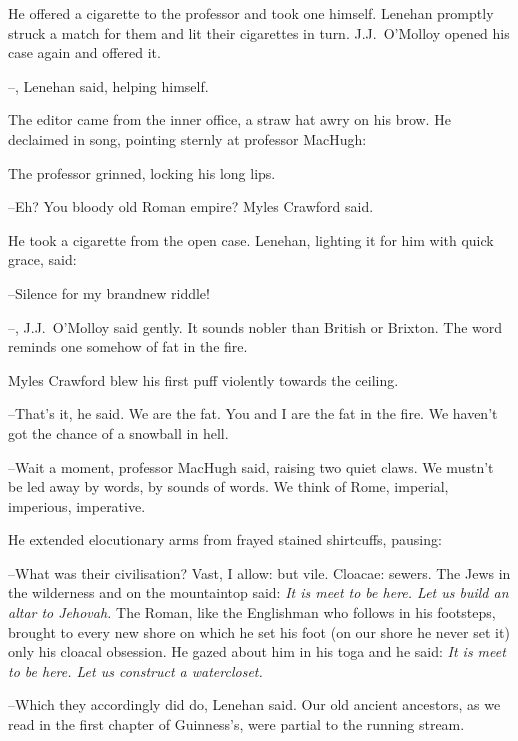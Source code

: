 
He offered a cigarette to the professor and took one himself.
Lenehan promptly struck a match for them and lit their cigarettes in turn.
J.J.~O'Molloy opened his case again and offered it.

--,
Lenehan said,
helping himself.

The editor came from the inner office,
a straw hat awry on his brow.
He declaimed in song,
pointing sternly at professor MacHugh:



The professor grinned,
locking his long lips.

--Eh?
You bloody old Roman empire?
Myles Crawford said.

He took a cigarette from the open case.
Lenehan,
lighting it for him with quick grace,
said:

--Silence for my brandnew riddle!

--,
J.J.~O'Molloy said gently.
It sounds nobler than British or Brixton.
The word reminds one somehow of fat in the fire.

Myles Crawford blew his first puff violently towards the ceiling.

--That's it,
he said.
We are the fat.
You and I are the fat in the fire.
We haven't got the chance of a snowball in hell.



--Wait a moment,
professor MacHugh said,
raising two quiet claws.
We mustn't be led away by words,
by sounds of words.
We think of Rome,
imperial, imperious, imperative.

He extended elocutionary arms from frayed stained shirtcuffs,
pausing:

--What was their civilisation?
Vast, I allow:
but vile.
Cloacae: sewers.
The Jews in the wilderness and on the mountaintop said:
\emph{It is meet to be here.
Let us build an altar to Jehovah.}
The Roman,
like the Englishman who follows in his footsteps,
brought to every new shore on which he set his foot
(on our shore he never set it)
only his cloacal obsession.
He gazed about him in his toga
and he said:
\emph{It is meet to be here.
Let us construct a watercloset.}

--Which they accordingly did do,
Lenehan said.
Our old ancient ancestors,
as we read in the first chapter of Guinness's,
were partial to the running stream.


